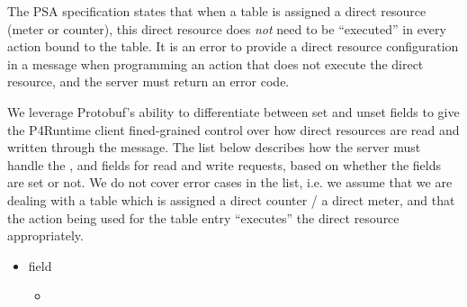 \documentclass[11pt]{article}
\begin{document}
{%
The PSA specification states that when a table is assigned a direct resource
(meter or counter), this direct resource does \emph{not} need to be \textquotedblleft{}executed\textquotedblright{} in
every action bound to the table. It is an error to provide a direct resource
configuration in a  message when programming an action that does not
execute the direct resource, and the server must return an 
error code.%

We leverage Protobuf's ability to differentiate between set and unset fields to
give the P4Runtime client fined-grained control over how direct resources are
read and written through the  message. The list below describes how
the server must handle the ,  and
 fields for read and write requests, based on whether the
fields are set or not. We do not cover error cases in the list, i.e. we assume
that we are dealing with a table which is assigned a direct counter / a direct
meter, and that the action being used for the table entry \textquotedblleft{}executes\textquotedblright{} the direct
resource appropriately.%

\begin{itemize}%

\item{}
 field%

\begin{itemize}[noitemsep,topsep=\mdcompacttopsep]%

\item{}


\end{itemize}
\end{itemize}}
\end{document}
